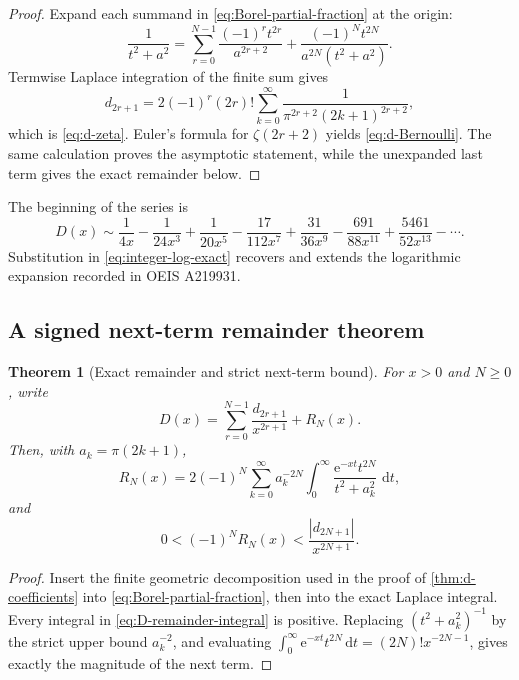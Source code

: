 \documentclass[11pt,a4paper]{article}
\numberwithin{equation}{section}
\newtheorem{theorem}{Theorem}[section]
\theoremstyle{definition}
\theoremstyle{remark}
\newcommand{\e}{\mathrm e}
\newcommand{\dd}{\,\mathrm d}
\begin{document}
\begin{proof}
Expand each summand in \cref{eq:Borel-partial-fraction} at the origin:
\[
 \frac1{t^2+a^2}
 =\sum_{r=0}^{N-1}\frac{(-1)^rt^{2r}}{a^{2r+2}}
  +\frac{(-1)^Nt^{2N}}{a^{2N}(t^2+a^2)}.
\]
Termwise Laplace integration of the finite sum gives
\[
 d_{2r+1}=2(-1)^r(2r)!
 \sum_{k=0}^\infty\frac1{\pi^{2r+2}(2k+1)^{2r+2}},
\]
which is \cref{eq:d-zeta}.  Euler's formula for \(\zeta(2r+2)\) yields
\cref{eq:d-Bernoulli}.  The same calculation proves the asymptotic
statement, while the unexpanded last term gives the exact remainder below.
\end{proof}

The beginning of the series is
\begin{equation}\label{eq:D-first}
 D(x)\sim
 \frac1{4x}-\frac1{24x^3}+\frac1{20x^5}
 -\frac{17}{112x^7}+\frac{31}{36x^9}
 -\frac{691}{88x^{11}}+\frac{5461}{52x^{13}}-\cdots.
\end{equation}
Substitution in \cref{eq:integer-log-exact} recovers and extends the
logarithmic expansion recorded in OEIS A219931.

\subsection{A signed next-term remainder theorem}

\begin{theorem}[Exact remainder and strict next-term bound]\label{thm:D-remainder}
For \(x>0\) and \(N\ge0\), write
\begin{equation}\label{eq:D-remainder-def}
 D(x)=\sum_{r=0}^{N-1}\frac{d_{2r+1}}{x^{2r+1}}+R_N(x).
\end{equation}
Then, with \(a_k=\pi(2k+1)\),
\begin{equation}\label{eq:D-remainder-integral}
 R_N(x)=2(-1)^N\sum_{k=0}^\infty a_k^{-2N}
 \int_0^\infty\frac{\e^{-xt}t^{2N}}{t^2+a_k^2}\,\dd t,
\end{equation}
and
\begin{equation}\label{eq:D-next-term-bound}
 0<(-1)^NR_N(x)
 <\frac{|d_{2N+1}|}{x^{2N+1}}.
\end{equation}
\end{theorem}

\begin{proof}
Insert the finite geometric decomposition used in the proof of
\cref{thm:d-coefficients} into \cref{eq:Borel-partial-fraction}, then into
the exact Laplace integral.  Every integral in
\cref{eq:D-remainder-integral} is positive.  Replacing
\((t^2+a_k^2)^{-1}\) by the strict upper bound \(a_k^{-2}\), and evaluating
\(\int_0^\infty\e^{-xt}t^{2N}\dd t=(2N)!x^{-2N-1}\), gives exactly the
magnitude of the next term.
\end{proof}
\end{document}
